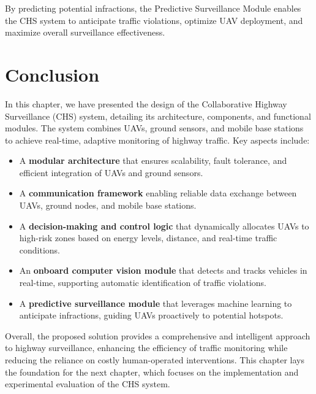 By predicting potential infractions, the Predictive Surveillance Module enables the CHS system to anticipate traffic violations, optimize UAV deployment, and maximize overall surveillance effectiveness.






\section{Conclusion}

In this chapter, we have presented the design of the Collaborative Highway Surveillance (CHS) system, detailing its architecture, components, and functional modules. The system combines UAVs, ground sensors, and mobile base stations to achieve real-time, adaptive monitoring of highway traffic. Key aspects include:

\begin{itemize}
    \item A \textbf{modular architecture} that ensures scalability, fault tolerance, and efficient integration of UAVs and ground sensors.
    \item A \textbf{communication framework} enabling reliable data exchange between UAVs, ground nodes, and mobile base stations.
    \item A \textbf{decision-making and control logic} that dynamically allocates UAVs to high-risk zones based on energy levels, distance, and real-time traffic conditions.
    \item An \textbf{onboard computer vision module} that detects and tracks vehicles in real-time, supporting automatic identification of traffic violations.
    \item A \textbf{predictive surveillance module} that leverages machine learning to anticipate infractions, guiding UAVs proactively to potential hotspots.
\end{itemize}

Overall, the proposed solution provides a comprehensive and intelligent approach to highway surveillance, enhancing the efficiency of traffic monitoring while reducing the reliance on costly human-operated interventions. This chapter lays the foundation for the next chapter, which focuses on the implementation and experimental evaluation of the CHS system.
